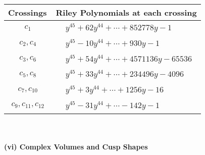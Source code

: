\documentclass[1p]{elsarticle_modified}
\theoremstyle{definition}
\begin{document}
\begin{tabular}{m{50pt}|m{274pt}}
Crossings & \hspace{64pt}Riley Polynomials at each crossing \\
\hline $$\begin{aligned}c_{1}\end{aligned}$$&$\begin{aligned}
&y^{45}+62 y^{44}+\cdots+852778 y-1
\end{aligned}$\\
\hline $$\begin{aligned}c_{2},c_{4}\end{aligned}$$&$\begin{aligned}
&y^{45}-10 y^{44}+\cdots+930 y-1
\end{aligned}$\\
\hline $$\begin{aligned}c_{3},c_{6}\end{aligned}$$&$\begin{aligned}
&y^{45}+54 y^{44}+\cdots+4571136 y-65536
\end{aligned}$\\
\hline $$\begin{aligned}c_{5},c_{8}\end{aligned}$$&$\begin{aligned}
&y^{45}+33 y^{44}+\cdots+234496 y-4096
\end{aligned}$\\
\hline $$\begin{aligned}c_{7},c_{10}\end{aligned}$$&$\begin{aligned}
&y^{45}+3 y^{44}+\cdots+1256 y-16
\end{aligned}$\\
\hline $$\begin{aligned}c_{9},c_{11},c_{12}\end{aligned}$$&$\begin{aligned}
&y^{45}-31 y^{44}+\cdots-142 y-1
\end{aligned}$\\
\hline
\end{tabular}\\~\\
\newpage\flushleft \textbf{(vi) Complex Volumes and Cusp Shapes}
\end{document}
